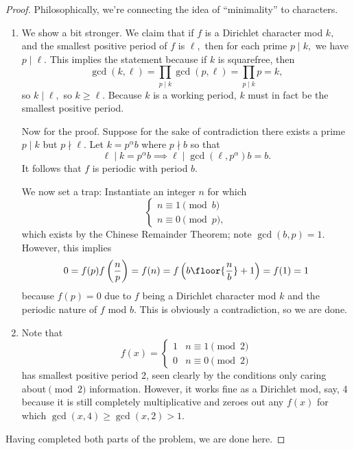 \begin{proof}
Philosophically, we're connecting the idea of ``minimality'' to characters.
\begin{enumerate}[label=(\alph*)]
    \item We show a bit stronger. We claim that if $f$ is a Dirichlet character mod $k,$ and the smallest positive period of $f$ is $\ell,$ then for each prime $p\mid k,$ we have $p\mid\ell.$ This implies the statement because if $k$ is squarefree, then
    \[\gcd(k,\ell)=\prod_{p\mid k}\gcd(p,\ell)=\prod_{p\mid k}p=k,\]
    so $k\mid\ell,$ so $k\ge\ell.$ Because $k$ is a working period, $k$ must in fact be the smallest positive period.
    
    Now for the proof. Suppose for the sake of contradiction there exists a prime $p\mid k$ but $p\nmid\ell.$ Let $k=p^\alpha b$ where $p\nmid b$ so that
    \[\ell\mid k=p^\alpha b\implies \ell\mid\gcd\left(\ell,p^\alpha\right)b=b.\]
    It follows that $f$ is periodic with period $b.$
    
    We now set a trap: Instantiate an integer $n$ for which
    \[\begin{cases}n\equiv1\pmod b\\n\equiv0\pmod p,\end{cases}\]
    which exists by the Chinese Remainder Theorem; note $\gcd(b,p)=1.$ However, this implies
    \[0=f(p)f\left(\frac np\right)=f(n)=f\left(b\floor{\frac nb}+1\right)=f(1)=1\]
    because $f(p)=0$ due to $f$ being a Dirichlet character mod $k$ and the periodic nature of $f$ mod $b.$ This is obviously a contradiction, so we are done.
    \item Note that
    \[f(x)=\begin{cases}1 & n\equiv1\pmod2\\0 & n\equiv0\pmod2\end{cases}\]
    has smallest positive period 2, seen clearly by the conditions only caring about$\pmod2$ information. However, it works fine as a Dirichlet mod, say, 4 because it is still completely multiplicative and zeroes out any $f(x)$ for which $\gcd(x,4)\ge\gcd(x,2)>1.$
\end{enumerate}
Having completed both parts of the problem, we are done here.
\end{proof}